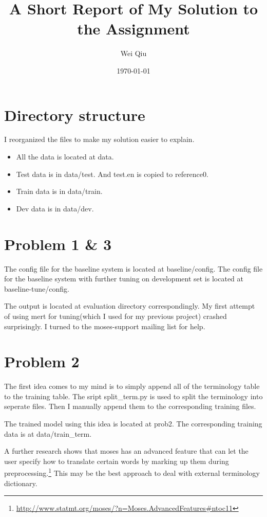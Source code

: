 \documentclass[a4paper]{article}
\title{A Short Report of My Solution to the Assignment}
\author{Wei Qiu}
\date{\today}
\begin{document}
\maketitle

\section{Directory structure}
I reorganized the files to make my solution easier to explain.
\begin{itemize}
    \item All the data is located at data.
    \item Test data is in data/test. And test.en is copied to reference0.
    \item Train data is in data/train. 
    \item Dev data is in data/dev.
\end{itemize}

\section{Problem 1 \& 3}
The config file  for the baseline system is located at  baseline/config.
The config file for the baseline system with further tuning on  development set is located at baseline-tune/config.

The output is located at evaluation directory correspondingly.
My first attempt of using mert for tuning(which I used for my previous project) crashed surprisingly. I turned to the moses-support mailing list for help.



\section{Problem 2}
The first idea comes to my mind is to simply append all of the terminology table to the training table. The sript split\_term.py is used to split the terminology into seperate files. Then I manually append them to the corresponding training files.

The trained model using this idea is located at prob2. The corresponding training data is at data/train\_term.

A further research shows that moses has an advanced feature that can let the user specify how to translate certain words by marking up them during preprocessing.\footnote{\url{http://www.statmt.org/moses/?n=Moses.AdvancedFeatures#ntoc11}}
This may be the best approach to deal with external terminology dictionary.
\end{document}
